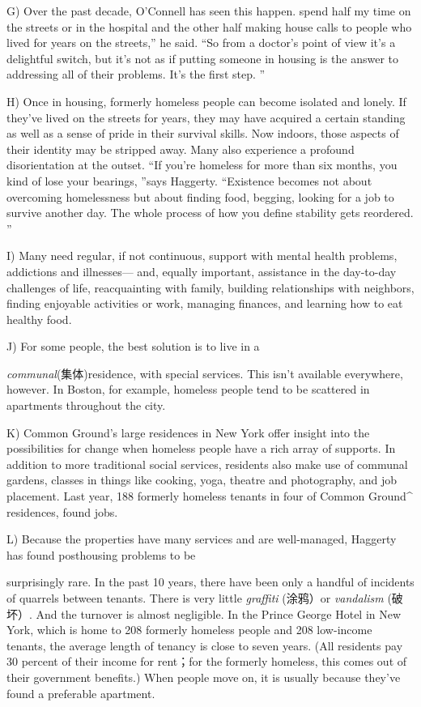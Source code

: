 \documentclass[UTF8,11pt]{ctexart}
\begin{document}
G) Over the past decade, O’Connell has seen this happen. spend half my time on the streets or in the hospital and the other half making house calls to people who lived for years on the streets,” he said. “So from a doctor’s point of view it’s a delightful switch, but it’s not as if putting someone in housing is the answer to addressing all of their problems. It’s the first step. ”


H) Once in housing, formerly homeless people can become isolated and lonely. If they’ve lived on the streets for years, they may have acquired a certain standing as well as a sense of pride in their survival skills. Now indoors, those aspects of their identity may be stripped away. Many also experience a profound disorientation at the outset. “If you’re homeless for more than six months, you kind of lose your bearings, ”says Haggerty. “Existence becomes not about overcoming homelessness but about finding food, begging, looking for a job to survive another day. The whole process of how you define stability gets reordered. ”


I) Many need regular, if not continuous, support with mental health problems, addictions and illnesses— and, equally important, assistance in the day-to-day challenges of life, reacquainting with family, building relationships with neighbors, finding enjoyable activities or work, managing finances, and learning how to eat healthy food.


J) For some people, the best solution is to live in a


\textit{communal}(集体)residence, with special services. This isn’t available everywhere, however. In Boston, for example, homeless people tend to be scattered in apartments throughout the city.


K) Common Ground’s large residences in New York offer insight into the possibilities for change when homeless people have a rich array of supports. In addition to more traditional social services, residents also make use of communal gardens, classes in things like cooking, yoga, theatre and photography, and job placement. Last year, 188 formerly homeless tenants in four of Common Ground\textasciicircum{} residences, found jobs.


L) Because the properties have many services and are well-managed, Haggerty has found posthousing problems to be


surprisingly rare. In the past 10 years, there have been only a handful of incidents of quarrels between tenants. There is very little\textit{ graffiti} (涂鸦）or\textit{ vandalism} (破坏）. And the turnover is almost negligible. In the Prince George Hotel in New York, which is home to 208 formerly homeless people and 208 low-income tenants, the average length of tenancy is close to seven years. (All residents pay 30 percent of their income for rent；for the formerly homeless, this comes out of their government benefits.) When people move on, it is usually because they’ve found a preferable apartment.
\end{document}
